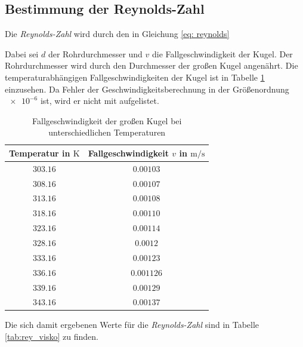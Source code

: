 \subsection{Bestimmung der Reynolds-Zahl}

Die \emph{Reynolds-Zahl} wird durch den in Gleichung \eqref{eq: reynolds}

Dabei sei $d$ der Rohrdurchmesser und $v$ die Fallgeschwindigkeit der Kugel.
Der Rohrdurchmesser wird durch den Durchmesser der großen Kugel angenährt.
Die temperaturabhängigen Fallgeschwindigkeiten der Kugel ist in Tabelle \ref{tab:fall_kugel} einzusehen.
Da Fehler der Geschwindigkeitsberechnung in der Größenordnung $\num{e-6}$ ist, 
wird er nicht mit aufgelistet.

\begin{table}
\centering
\begin{tabular} {cc}
  \toprule
  Temperatur in $\si{\kelvin}$ & Fallgeschwindigkeit $v$ in $\si{\meter\per\second}$ \\
  \midrule 
  $\num{303.16}$ & $\num{0.00103}$ \\
  $\num{308.16}$ & $\num{0.00107}$ \\
  $\num{313.16}$ & $\num{0.00108}$ \\ 
  $\num{318.16}$ & $\num{0.00110}$ \\
  $\num{323.16}$ & $\num{0.00114}$ \\ 
  $\num{328.16}$ & $\num{0.0012}$ \\ 
  $\num{333.16}$ & $\num{0.00123}$ \\ 
  $\num{336.16}$ & $\num{0.001126}$ \\
  $\num{339.16}$ & $\num{0.00129}$ \\
  $\num{343.16}$ & $\num{0.00137}$ \\
\bottomrule
\end{tabular}
\caption{Fallgeschwindigkeit der großen Kugel bei unterschiedlichen Temperaturen}
\label{tab:fall_kugel}
\end{table}

Die sich damit ergebenen Werte für die \emph{Reynolds-Zahl} sind in Tabelle \ref{tab:rey_visko} 
zu finden.

